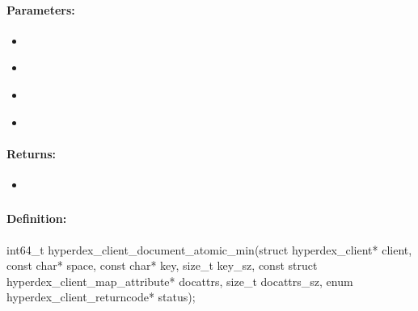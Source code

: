 \paragraph{Parameters:}
\begin{itemize}[noitemsep]
\item {}\\

\item {}\\

\item {}\\

\item {}\\

\end{itemize}

\paragraph{Returns:}
\begin{itemize}[noitemsep]
\item {}\\

\end{itemize}

\pagebreak
\subsubsection{}
\label{api:c:document_atomic_min}


\paragraph{Definition:}
\begin{ccode}
int64_t hyperdex_client_document_atomic_min(struct hyperdex_client* client,
        const char* space,
        const char* key, size_t key_sz,
        const struct hyperdex_client_map_attribute* docattrs, size_t docattrs_sz,
        enum hyperdex_client_returncode* status);
\end{ccode}

